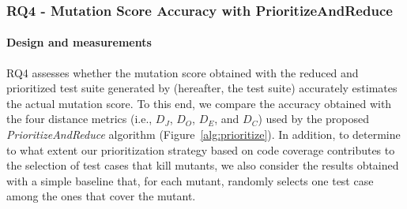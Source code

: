 %
%
%


\subsubsection{RQ4 - Mutation Score Accuracy with PrioritizeAndReduce}
\label{exp:accuracy:prioritize}

\paragraph{Design and measurements}


RQ4 assesses whether the mutation score obtained with the reduced and prioritized test suite generated by \APPR (hereafter, the \APPR test suite) accurately estimates the actual mutation  score.
To this end, we compare the accuracy obtained with the four distance metrics (i.e., $D_J$, $D_O$, $D_E$, and $D_C$) used by the proposed \emph{PrioritizeAndReduce} algorithm (Figure~\ref{alg:prioritize}). In addition, to determine to what extent our prioritization strategy based on code coverage contributes to the selection of test cases that kill mutants, we also consider the results obtained with a simple baseline that, for each mutant, randomly selects one test case among the ones that cover the mutant. 



